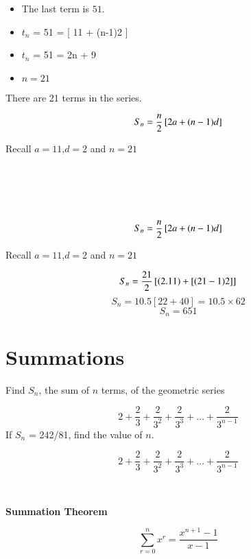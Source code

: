 \documentclass[12pt]{article}
\begin{document}
\begin{itemize}
\item The last term is $51$.
\item $t_n$ = 51 = [ 11 + (n-1)2 ] 
\item $t_n$ = 51 = 2n + 9
\item $n=21$
\end{itemize}
There are 21 terms in the series.



\[ S_n  = {n \over 2} \left[ 2a+(n-1)d \right] \]

Recall $a=11$,$d=2$ and $n=21$


\[ \phantom{S_n  = {21 \over 2} \left[ (2.11) +[(21-1)2] \right]} \]
\[ \phantom{S_n  = 10.5 \left[ 22 + 40 \right]  = 10.5 \times 62}\]
\[ \phantom{S_n  = 651} \] 



\[ S_n  = {n \over 2} \left[ 2a+(n-1)d \right] \]

Recall $a=11$,$d=2$ and $n=21$


\[ S_n  = {21 \over 2} \left[ (2.11) +[(21-1)2] \right] \]
\[ S_n  = 10.5 \left[ 22 + 40 \right]  = 10.5 \times 62\]
\[ S_n  = 651 \] 




\section{Summations}

Find $S_n$, the sum of $n$ terms, of the geometric series

\[  2 + \frac{2}{3} + \frac{2}{3^2} + \frac{2}{3^3} +  \ldots + \frac{2}{3^{n-1}} \]
\bigskip
If $S_n$ = 242/81, find the value of $n$.





\[  2 + \frac{2}{3} + \frac{2}{3^2} + \frac{2}{3^3} +  \ldots + \frac{2}{3^{n-1}} \]
\[ \phantom{ 2 \times \left[ 1 + \frac{1}{3} + \frac{1}{3^2} + \frac{1}{3^3} +  \ldots + \frac{1}{3^{n-1}}   \right]  } \]


\textbf{Summation Theorem}

\[ \sum^{n}_{r=0} x^r = \frac{x^{n+1}-1}{x-1} \]
\[ \phantom{k \sum^{n}_{r=0} x^r = k \frac{x^{n+1}-1}{x-1}  } \]
\phantom{Here $k=2$ and $x = 1/3$ }
\end{document}
